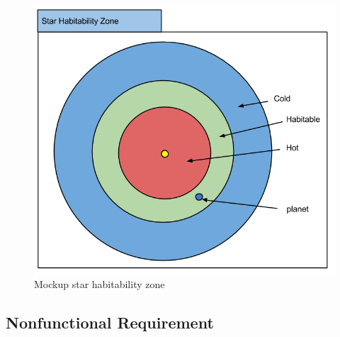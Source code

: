 \begin{enumerate}
\begin{figure}[h!]
  \centering
      \includegraphics[width=.5\textwidth]{images/mockStarHabitability.png}
  \caption{Mockup star habitability zone}  
\end{figure}




\end{enumerate}

\subsection{Nonfunctional Requirement}

